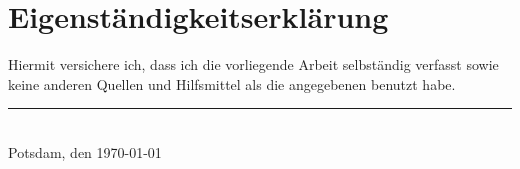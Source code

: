 \chapter*{Eigenständigkeitserklärung}

\thispagestyle{empty}

Hiermit versichere ich, dass ich die vorliegende Arbeit selbständig
verfasst sowie keine anderen Quellen und Hilfsmittel als die angegebenen
benutzt habe.\\[5\baselineskip]

\flushright
\rule{.4\textwidth}{0.4pt}\\[-1mm]
Potsdam, den \today\\
\makeatletter\@author\makeatother

\clearpage
\thispagestyle{empty}
~
